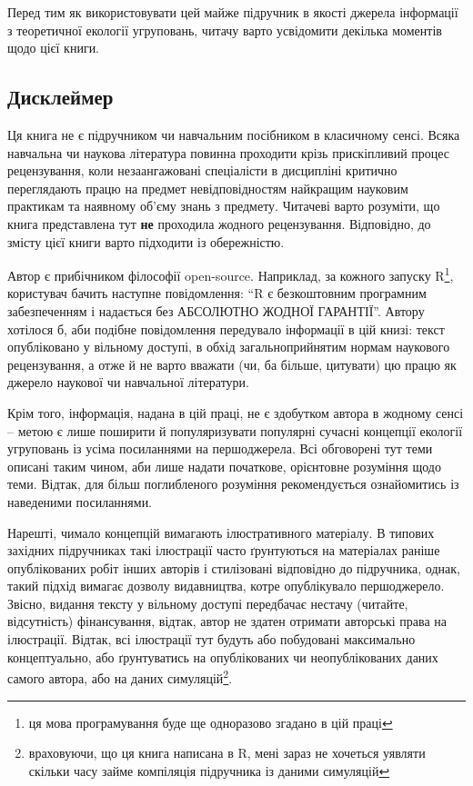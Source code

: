 \documentclass[
  11pt,
]{book}
\begin{document}
Перед тим як використовувати цей майже підручник в якості джерела інформації з теоретичної екології угруповань, читачу варто усвідомити декілька моментів щодо цієї книги.

\subsection{Дисклеймер}\label{readme}

Ця книга не є підручником чи навчальним посібником в класичному сенсі. Всяка навчальна чи наукова література повинна проходити крізь прискіпливий процес рецензування, коли незаангажовані спеціалісти в дисципліні критично переглядають працю на предмет невідповідностям найкращим науковим практикам та наявному об'єму знань з предмету. Читачеві варто розуміти, що книга представлена тут \textbf{не} проходила жодного рецензування. Відповідно, до змісту цієї книги варто підходити із обережністю.

Автор є прибічником філософії open-source. Наприклад, за кожного запуску R\footnote{ця мова програмування буде ще одноразово згадано в цій праці}, користувач бачить наступне повідомлення: ``R є безкоштовним програмним забезпеченням і надається без АБСОЛЮТНО ЖОДНОЇ ГАРАНТІЇ''. Автору хотілося б, аби подібне повідомлення передувало інформації в цій книзі: текст опубліковано у вільному доступі, в обхід загальноприйнятим нормам наукового рецензування, а отже й не варто вважати (чи, ба більше, цитувати) цю працю як джерело наукової чи навчальної літератури.

Крім того, інформація, надана в цій праці, не є здобутком автора в жодному сенсі -- метою є лише поширити й популяризувати популярні сучасні концепції екології угруповань із усіма посиланнями на першоджерела. Всі обговорені тут теми описані таким чином, аби лише надати початкове, орієнтовне розуміння щодо теми. Відтак, для більш поглибленого розуміння рекомендується ознайомитись із наведеними посиланнями.

Нарешті, чимало концепцій вимагають ілюстративного матеріалу. В типових західних підручниках такі ілюстрації часто ґрунтуються на матеріалах раніше опублікованих робіт інших авторів і стилізовані відповідно до підручника, однак, такий підхід вимагає дозволу видавництва, котре опублікувало першоджерело. Звісно, видання тексту у вільному доступі передбачає нестачу (читайте, відсутність) фінансування, відтак, автор не здатен отримати авторські права на ілюстрації. Відтак, всі ілюстрації тут будуть або побудовані максимально концептуально, або ґрунтуватись на опублікованих чи неопублікованих даних самого автора, або на даних симуляцій\footnote{враховуючи, що ця книга написана в R, мені зараз не хочеться уявляти скільки часу займе компіляція підручника із даними симуляцій}.
\end{document}
